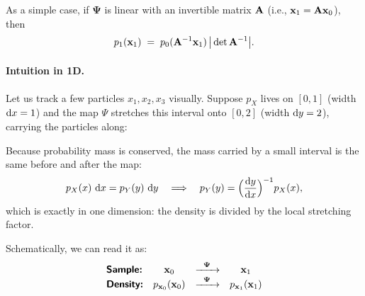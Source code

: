 As a simple case, if $\bm{\Psi}$ is linear with an invertible matrix ${\mathbf{A}}$ (i.e., ${\mathbf{x}}_1={\mathbf{A}}{\mathbf{x}}_0$), then
\[
p_1({\mathbf{x}}_1)\;=\;p_0({\mathbf{A}}^{-1}{\mathbf{x}}_1)\,\big|\det {\mathbf{A}}^{-1}\big|.
\]

\begin{nknote}
\paragraph{Intuition in 1D.}
Let us track a few particles $x_1,x_2,x_3$ visually. Suppose $p_X$ lives on $[0,1]$ (width $\mathop{}\!\mathrm{d} x = 1$) and the map $\Psi$ stretches this interval onto $[0,2]$ (width $\mathop{}\!\mathrm{d} y = 2$), carrying the particles along:
\begin{center}
\end{center}
Because probability mass is conserved, the mass carried by a small interval is the same before and after the map:
\[
p_X(x)\,\mathop{}\!\mathrm{d} x = p_Y(y)\,\mathop{}\!\mathrm{d} y
\quad\Longrightarrow\quad
p_Y(y) = \Big(\frac{\mathop{}\!\mathrm{d} y}{\mathop{}\!\mathrm{d} x}\Big)^{-1} p_X(x),
\]
which is exactly  in one dimension: the density is divided by the local stretching factor.
\end{nknote}

Schematically, we can read it as:
\[
\begin{array}{lccc}
   \text{{\sffamily\textbf{Sample:}}} & {\mathbf{x}}_0 & \xrightarrow{\hspace{0.2cm} \bm{\Psi} \hspace{0.2cm}} & {\mathbf{x}}_1  \\
   \text{{\sffamily\textbf{Density:}}} & p_{{\mathbf{x}}_0}({\mathbf{x}}_0) & \xrightarrow{\hspace{0.2cm} \bm{\Psi} \hspace{0.2cm}} & p_{{\mathbf{x}}_1}({\mathbf{x}}_1) 
\end{array}
\]


